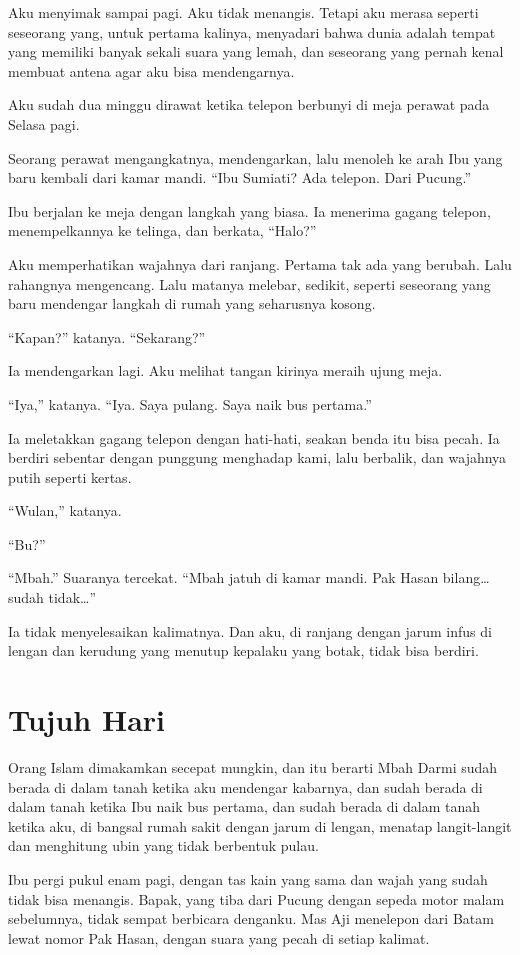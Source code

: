 \documentclass[11pt,twoside,openany]{book}
\makeatletter
\newcommand{\scenebreak}{\par\vspace{0.9em}{\centering\textsc{*\hspace{0.7em}*\hspace{0.7em}*}\par}\vspace{0.9em}\@afterindentfalse\@afterheading}
\makeatother
\begin{document}
Aku menyimak sampai pagi. Aku tidak menangis. Tetapi aku merasa seperti seseorang yang, untuk pertama kalinya, menyadari bahwa dunia adalah tempat yang memiliki banyak sekali suara yang lemah, dan seseorang yang pernah kenal membuat antena agar aku bisa mendengarnya.

\scenebreak
Aku sudah dua minggu dirawat ketika telepon berbunyi di meja perawat pada Selasa pagi.

Seorang perawat mengangkatnya, mendengarkan, lalu menoleh ke arah Ibu yang baru kembali dari kamar mandi. ``Ibu Sumiati? Ada telepon. Dari Pucung.''

Ibu berjalan ke meja dengan langkah yang biasa. Ia menerima gagang telepon, menempelkannya ke telinga, dan berkata, ``Halo?''

Aku memperhatikan wajahnya dari ranjang. Pertama tak ada yang berubah. Lalu rahangnya mengencang. Lalu matanya melebar, sedikit, seperti seseorang yang baru mendengar langkah di rumah yang seharusnya kosong.

``Kapan?'' katanya. ``Sekarang?''

Ia mendengarkan lagi. Aku melihat tangan kirinya meraih ujung meja.

``Iya,'' katanya. ``Iya. Saya pulang. Saya naik bus pertama.''

Ia meletakkan gagang telepon dengan hati-hati, seakan benda itu bisa pecah. Ia berdiri sebentar dengan punggung menghadap kami, lalu berbalik, dan wajahnya putih seperti kertas.

``Wulan,'' katanya.

``Bu?''

``Mbah.'' Suaranya tercekat. ``Mbah jatuh di kamar mandi. Pak Hasan bilang\ldots{} sudah tidak\ldots{}''

Ia tidak menyelesaikan kalimatnya. Dan aku, di ranjang dengan jarum infus di lengan dan kerudung yang menutup kepalaku yang botak, tidak bisa berdiri.

\chapter{Tujuh Hari}
Orang Islam dimakamkan secepat mungkin, dan itu berarti Mbah Darmi sudah berada di dalam tanah ketika aku mendengar kabarnya, dan sudah berada di dalam tanah ketika Ibu naik bus pertama, dan sudah berada di dalam tanah ketika aku, di bangsal rumah sakit dengan jarum di lengan, menatap langit-langit dan menghitung ubin yang tidak berbentuk pulau.

Ibu pergi pukul enam pagi, dengan tas kain yang sama dan wajah yang sudah tidak bisa menangis. Bapak, yang tiba dari Pucung dengan sepeda motor malam sebelumnya, tidak sempat berbicara denganku. Mas Aji menelepon dari Batam lewat nomor Pak Hasan, dengan suara yang pecah di setiap kalimat.
\end{document}
